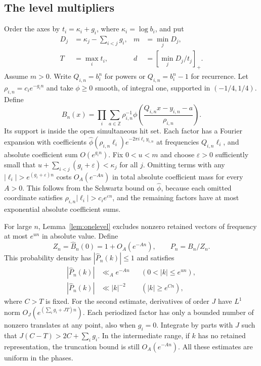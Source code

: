\documentclass[11pt,a4paper,reqno]{amsart}
\theoremstyle{definition}
\theoremstyle{remark}
\numberwithin{equation}{section}
\begin{document}
\subsection{The level multipliers}
Order the axes by \(t_i=\kappa_i+g_i\), where \(\kappa_i=\log b_i\), and put
\[
 \begin{aligned}
 D_j&=\kappa_j-\sum_{i<j}g_i, & m&=\min_j D_j,\\
 T&=\max_i t_i, & d&=\left[\min_j D_j/t_j\right]_+.
 \end{aligned}
\]
Assume \(m>0\). Write \(Q_{i,n}=b_i^n\) for powers or \(Q_{i,n}=b_i^n-1\) for recurrence. Let \(\rho_{i,n}=c_i e^{-g_i n}\) and take \(\phi\ge0\) smooth, of integral one, supported in \((-1/4,1/4)\). Define
\[
 B_n(x)=\prod_i\sum_{a\in\mathbb Z}\rho_{i,n}^{-1}
      \phi\!\left(\frac{Q_{i,n}x-y_{i,n}-a}{\rho_{i,n}}\right).
\]
Its support is inside the open simultaneous hit set. Each factor has a Fourier expansion with coefficients \(\widehat\phi(\rho_{i,n}\ell_i)e^{-2\pi i\ell_i y_{i,n}}\) at frequencies \(Q_{i,n}\ell_i\), and absolute coefficient sum \(O(e^{g_i n})\). Fix \(0<u<m\) and choose \(\varepsilon>0\) sufficiently small that \(u+\sum_{i<j}(g_i+\varepsilon)<\kappa_j\) for all \(j\). Omitting terms with any \(|\ell_i|>e^{(g_i+\varepsilon)n}\) costs \(O_A(e^{-An})\) in total absolute coefficient mass for every \(A>0\). This follows from the Schwartz bound on \(\widehat\phi\), because each omitted coordinate satisfies \(\rho_{i,n}|\ell_i|>c_i e^{\varepsilon n}\), and the remaining factors have at most exponential absolute coefficient sums.

For large \(n\), Lemma~\ref{lem:onelevel} excludes nonzero retained vectors of frequency at most \(e^{un}\) in absolute value. Define
\[
   Z_n=\widehat B_n(0)=1+O_A(e^{-An}),\qquad P_n=B_n/Z_n .
\]
This probability density has \(|\widehat P_n(k)|\le1\) and satisfies
\begin{equation}\label{eq:level-frequency-bounds}
 \begin{aligned}
 |\widehat P_n(k)|&\ll_A e^{-An} &&(0<|k|\le e^{un}),\\
 |\widehat P_n(k)|&\ll |k|^{-2} &&(|k|\ge e^{Cn}),
 \end{aligned}
\end{equation}
where \(C>T\) is fixed. For the second estimate, derivatives of order \(J\) have \(L^1\) norm \(O_J(e^{(\sum_i g_i+JT)n})\). Each periodized factor has only a bounded number of nonzero translates at any point, also when \(g_i=0\). Integrate by parts with \(J\) such that \(J(C-T)>2C+\sum_i g_i\). In the intermediate range, if \(k\) has no retained representation, the truncation bound is still \(O_A(e^{-An})\). All these estimates are uniform in the phases.
\end{document}
